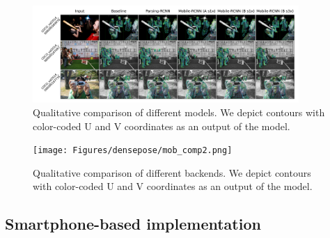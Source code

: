 \begin{figure}[t!]
\centering
\includegraphics[width=0.9\textwidth]{Figures/densepose/qconfigs_decr.png}
\caption{Qualitative comparison of different models. We depict contours with color-coded U and V coordinates as an output of the model.}
\label{fig:fconfigs}
\end{figure}

\begin{figure}[t!]
\centering
\texttt{[image: Figures/densepose/mob\_comp2.png]}
\caption{Qualitative comparison of different backends. We depict contours with color-coded U and V coordinates as an output of the model.}
\label{fig:configs}
\end{figure}

\subsection{Smartphone-based implementation}


\begin{table}[t!]
\centering
{}
\caption{The impact of image size. Results are obtained with Mobile Parsing R-CNN (B s3x, test-tuned) on DensePose-COCO \textit{minival}. The N/A values correspond to tensor sizes that produced errors on mobile device}
\label{table:pixel}
\end{table}

